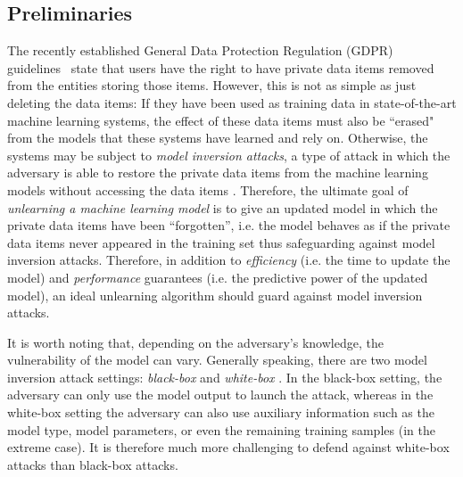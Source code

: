 \documentclass[11pt]{article}
\newcommand{\priu}{PrIU}
\newcommand{\deltagrad}{DeltaGrad}
\begin{document}
\subsection{Preliminaries}\label{eq: model_inversion_attack}
The recently established General Data Protection Regulation 
(GDPR) guidelines~\cite{voigt2017eu} state that users have the right to have private data items removed from the entities storing those items. However, this is not as simple as just deleting the data items:  If they have been used as training data in state-of-the-art machine learning systems, the effect of these data items must also be ``erased"  from the models that these systems have learned and rely on. Otherwise, the systems may be subject to \emph{model inversion attacks}, a type of attack in which the adversary is able to restore the private data items from the machine learning models without accessing the data items  \cite{fredrikson2015model}. Therefore, the ultimate goal of \emph{unlearning a machine learning model} is to give an updated model in which the private data items have been ``forgotten'', i.e. the model behaves as if the private data items never appeared in the training set thus safeguarding against model inversion attacks. 
Therefore, in addition to {\em efficiency} (i.e. the time to update the model) and {\em performance} guarantees (i.e. the predictive power of the updated model), an ideal unlearning algorithm should guard against model inversion attacks.

It is worth noting that, depending on the adversary's knowledge, the vulnerability of the model can vary. Generally speaking, there are two model inversion attack settings: \emph{black-box} and \emph{white-box} \cite{fredrikson2015model}. In the black-box setting, the adversary can only use the model output to launch the attack, whereas in the white-box setting the adversary can also use auxiliary information such as the model type, model parameters, or even the remaining training samples (in the extreme case). It is therefore much more challenging to defend against white-box attacks than black-box attacks. 


\end{document}
